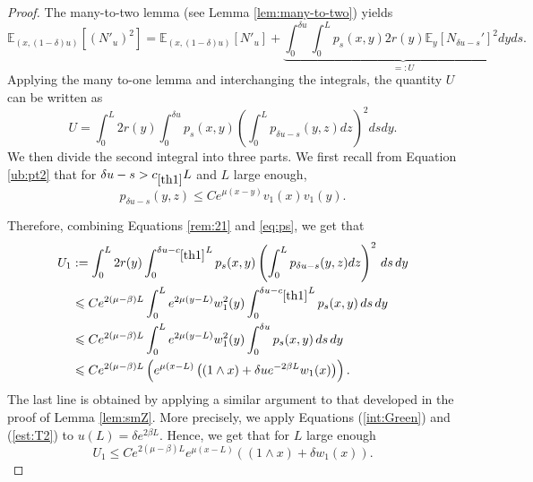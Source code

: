\documentclass[11pt]{article}
\theoremstyle{plain}
\newcommand\vep{\varepsilon}
\begin{document}
\begin{proof}
The many-to-two lemma (see Lemma \ref{lem:many-to-two}) yields
\begin{equation*}
\mathbb{E}_{(x,(1-\delta)u)}\left[(N'_{u})^2\right]=\mathbb{E}_{(x,(1-\delta)u)}\left[N'_{u}\right]+ \underbrace{\int_0^{\delta u}\int_0^Lp_s(x,y)2r(y)\mathbb{E}_{y}\left[N_{\delta u-s}'\right]^2dyds}_{\textstyle=:U}. 
\end{equation*}
Applying the many to-one lemma and interchanging the integrals, the quantity $U$ can be written as
\begin{equation*}
U=\int_0^L2r(y)\int_0^{\delta u}p_s(x,y)\left(\int_0^Lp_{\delta u-s}(y,z) dz\right)^2 dsdy. 
\end{equation*}
We then divide the second integral into three parts.
 We first recall from Equation \eqref{ub:pt2} that for $\delta u-s>c_{\ref{th1}} L$ and $L$ large enough,
\begin{equation}
p_{\delta u-s}(y,z)\leqslant C e^{\mu(x-y)}v_1(x)v_1(y). \label{eq:ps}
\end{equation}

Therefore, combining Equations \eqref{rem:21} and \eqref{eq:ps}, we get that 
\begin{align*}
U_1&:=\int_0^L2r(y)\int_{0}^{\delta u-c_{\ref{th1}}L}p_s(x,y)\left(\int_0^Lp_{\delta u-s}(y,z) dz\right)^2 \,ds\,dy\\
&\leqslant  C e^{2(\mu-\beta)L}\int_0^Le^{2\mu(y-L)}w_1^2(y)\int_0^{\delta u-c_{\ref{th1}} L}p_s(x,y)\,ds\,dy\\
&\leqslant  Ce^{2(\mu-\beta)L}\int_0^Le^{2\mu(y-L)}w_1^2(y)\int_0^{\delta u}p_s(x,y)\,ds\,dy\\
&\leqslant  Ce^{2(\mu-\beta)L}\left(e^{\mu(x-L)}\left((1\wedge x)+\delta u e^{-2\beta L}w_1(x)\right)\right).
\end{align*}
The last line is obtained by applying a similar argument to that developed in the proof of Lemma \ref{lem:smZ}. More precisely, we apply Equations (\ref{int:Green}) and (\ref{est:T2}) to $u(L)=\delta e^{2\beta L}$. Hence, we get that for $L$ large enough
\begin{equation}\label{est:A1:N}
U_1\leqslant C e^{2(\mu-\beta)L}e^{\mu(x-L)}\left((1\wedge x)+\delta w_1(x)\right).\end{equation}



\end{proof}
\end{document}
